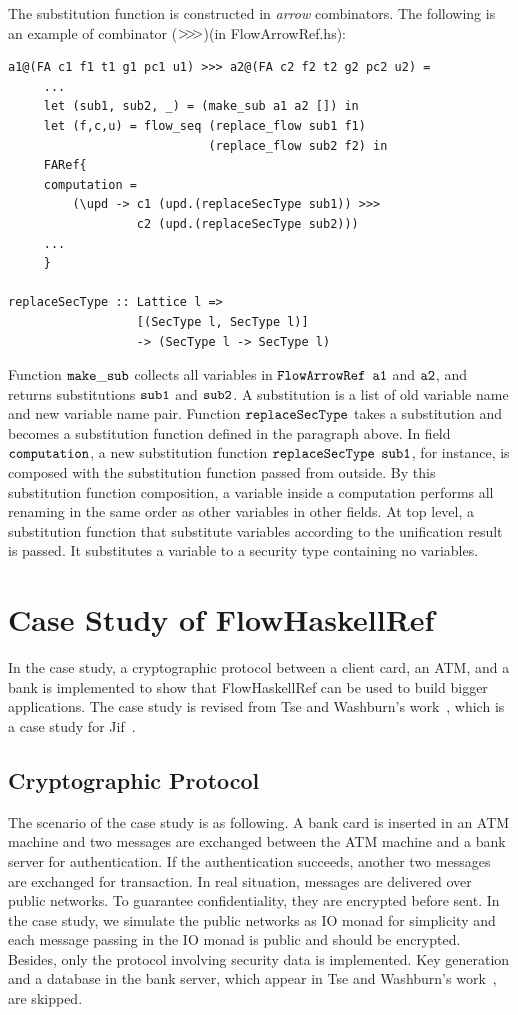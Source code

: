 \documentclass[a4paper]{report}
\newcommand{\arrowop}[1]{$#1\negthickspace #1\negthickspace #1$}
\newcommand{\co}[1]{$\cod{#1}$}
\begin{document}
The substitution function is constructed in {\em arrow} combinators. The following is an example of combinator
(\arrowop{>})(in FlowArrowRef.hs):
\begin{Verbatim}[fontsize=\footnotesize]
a1@(FA c1 f1 t1 g1 pc1 u1) >>> a2@(FA c2 f2 t2 g2 pc2 u2) =
     ...
     let (sub1, sub2, _) = (make_sub a1 a2 []) in
     let (f,c,u) = flow_seq (replace_flow sub1 f1) 
                            (replace_flow sub2 f2) in
     FARef{
     computation = 
         (\upd -> c1 (upd.(replaceSecType sub1)) >>>
                  c2 (upd.(replaceSecType sub2)))
     ...
     }

replaceSecType :: Lattice l => 
                  [(SecType l, SecType l)] 
                  -> (SecType l -> SecType l)
\end{Verbatim}
Function \co{make\_sub} collects all variables in \co{FlowArrowRef} \co{a1} and \co{a2}, and returns 
substitutions \co{sub1} and \co{sub2}. A substitution is a list of old variable name and new variable name pair. 
Function \co{replaceSecType} takes a substitution and becomes
a substitution function defined in the paragraph above. In field \co{computation}, a new substitution 
function \co{replaceSecType} \co{sub1}, for instance,  
is composed with the substitution function
passed from outside. By this substitution function composition, a variable inside a computation 
performs all renaming in the same order as other variables in other fields. At top level, 
a substitution function that substitute variables according to the unification result is passed. 
It substitutes a variable to a security type containing no variables.

\chapter{Case Study of FlowHaskellRef}

In the case study, a cryptographic protocol between a client card, an ATM, and a bank is implemented
to show that FlowHaskellRef can be used to build bigger applications. The case study is revised
from Tse and Washburn's work~\cite{Tse:Washburn:jif}, which is a case study for Jif~\cite{jif}.

\section{Cryptographic Protocol}
The scenario of the case study is as following.
A bank card is inserted in an ATM machine and two messages are exchanged between the ATM 
machine and a bank server for authentication. If the authentication succeeds, another
two messages are exchanged for transaction. In real situation, messages are delivered over public
networks. To guarantee confidentiality, they are encrypted before sent. In the case study, we
simulate the public networks as IO monad for simplicity and each message passing in the IO monad is 
public and should be encrypted. Besides, only the protocol involving security data is implemented.
Key generation and a database in the bank server, which appear in 
Tse and Washburn's work~\cite{Tse:Washburn:jif}, are skipped.
\end{document}
